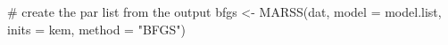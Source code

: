 \begin{Schunk}
\begin{Sinput}
 # create the par list from the output
 bfgs <- MARSS(dat, model = model.list, inits = kem, method = "BFGS")
\end{Sinput}
\end{Schunk}
